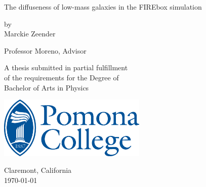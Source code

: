 \documentclass[12pt, oneside]{book}
\begin{document}
\begin{titlepage}
\begin{center}

\vspace*{2cm}

{\huge The diffuseness of low-mass galaxies in the FIREbox simulation} %

\vspace{2cm}

{\large by\\Marckie Zeender}

\vspace{2cm}
{Professor Moreno, Advisor}

\vfill

A thesis submitted in partial fulfillment\\
of the requirements for the Degree of \\
Bachelor of Arts in Physics

\vspace*{1.5cm}

\includegraphics[width=200pt]{pomona.eps}

\vspace*{0.5cm}
Claremont, California\\
\today %
\end{center}
\end{titlepage}

\frontmatter 


\end{document}
